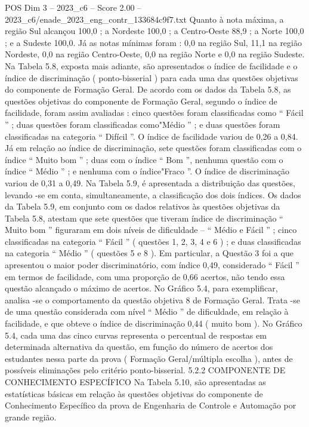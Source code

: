 \begin{textsample}{POS Dim 3 – 2023\_c6 – Score 2.00 – 2023\_c6/enade\_2023\_eng\_contr\_133684c9f7.txt}
Quanto à nota máxima, a região Sul alcançou 100,0 ; a Nordeste 100,0 ; a Centro-Oeste 88,9 ; a Norte 100,0 ; e a Sudeste 100,0.
Já as notas mínimas foram : 0,0 na região Sul, 11,1 na região Nordeste, 0,0 na região Centro-Oeste, 0,0 na região Norte e 0,0 na região Sudeste.
Na Tabela 5.8, exposta mais adiante, são apresentados o índice de facilidade e o índice de discriminação ( ponto-bisserial ) para cada uma das questões objetivas do componente de Formação Geral.
De acordo com os dados da Tabela 5.8, as questões objetivas do componente de Formação Geral, segundo o índice de facilidade, foram assim avaliadas : cinco questões foram classificadas como “ Fácil ” ; duas questões foram classificadas como"Médio ” ; e duas questões foram classificadas na categoria “ Difícil ”.
O índice de facilidade variou de 0,26 a 0,84.
Já em relação ao índice de discriminação, sete questões foram classificadas com o índice “ Muito bom ” ; duas com o índice “ Bom ”, nenhuma questão com o índice “ Médio ” ; e nenhuma com o índice"Fraco ”.
O índice de discriminação variou de 0,31 a 0,49.
Na Tabela 5.9, é apresentada a distribuição das questões, levando -se em conta, simultaneamente, a classificação dos dois índices.
Os dados da Tabela 5.9, em conjunto com os dados relativos às questões objetivas da Tabela 5.8, atestam que sete questões que tiveram índice de discriminação “ Muito bom ” figuraram em dois níveis de dificuldade – “ Médio e Fácil ” ; cinco classificadas na categoria “ Fácil ” ( questões 1, 2, 3, 4 e 6 ) ; e duas classificadas na categoria “ Médio ” ( questões 5 e 8 ).
Em particular, a Questão 3 foi a que apresentou o maior poder discriminatório, com índice 0,49, considerado “ Fácil ” em termos de facilidade, com uma proporção de 0,66 acertos, não tendo essa questão alcançado o máximo de acertos.
No Gráfico 5.4, para exemplificar, analisa -se o comportamento da questão objetiva 8 de Formação Geral.
Trata -se de uma questão considerada com nível “ Médio ” de dificuldade, em relação à facilidade, e que obteve o índice de discriminação 0,44 ( muito bom ).
No Gráfico 5.4, cada uma das cinco curvas representa o percentual de respostas em determinada alternativa da questão, em função do número de acertos dos estudantes nessa parte da prova ( Formação Geral/múltipla escolha ), antes de possíveis eliminações pelo critério ponto-bisserial. 5.2.2 COMPONENTE DE CONHECIMENTO ESPECÍFICO Na Tabela 5.10, são apresentadas as estatísticas básicas em relação às questões objetivas do componente de Conhecimento Específico da prova de Engenharia de Controle e Automação por grande região.

\end{textsample}

